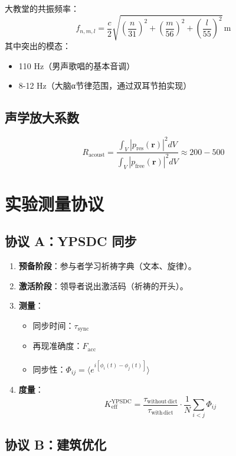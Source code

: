\documentclass[12pt,a4paper]{article}
\begin{document}
	大教堂的共振频率：
	\[
	f_{n,m,l} = \frac{c}{2} \sqrt{\left(\frac{n}{31}\right)^2 + \left(\frac{m}{56}\right)^2 + \left(\frac{l}{55}\right)^2} \, \mathrm{m}
	\]
	其中突出的模态：
	\begin{itemize}
		\item 110 Hz（男声歌唱的基本音调）
		\item 8-12 Hz（大脑α节律范围，通过双耳节拍实现）
	\end{itemize}
	
	\subsection{声学放大系数}
	\[
	R_{\mathrm{acoust}} = \frac{\int_V |p_{\mathrm{res}}(\mathbf{r})|^2 dV}{\int_V |p_{\mathrm{free}}(\mathbf{r})|^2 dV} \approx 200-500
	\]
	
	\section{实验测量协议}
	
	\subsection{协议 A：YPSDC 同步}
	
	\begin{enumerate}
		\item \textbf{预备阶段}：参与者学习祈祷字典（文本、旋律）。
		\item \textbf{激活阶段}：领导者说出激活码（祈祷的开头）。
		\item \textbf{测量}：
		\begin{itemize}
			\item 同步时间：$\tau_{\mathrm{sync}}$
			\item 再现准确度：$F_{\mathrm{acc}}$
			\item 同步性：$\Phi_{ij} = \langle e^{i[\phi_i(t) - \phi_j(t)]} \rangle$
		\end{itemize}
		\item \textbf{度量}：
		\[
		K_{\mathrm{eff}}^{\mathrm{YPSDC}} = \frac{\tau_{\mathrm{without\,dict}}}{\tau_{\mathrm{with\,dict}}} \cdot \frac{1}{N} \sum_{i<j} \Phi_{ij}
		\]
	\end{enumerate}
	
	\subsection{协议 B：建筑优化}
	
\end{document}
